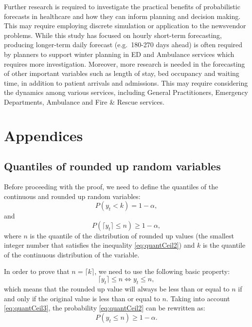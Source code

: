\documentclass[]{elsarticle} %
\begin{document}
Further research is required to investigate the practical benefits of probabilistic forecasts in healthcare and how they can inform planning and decision making. This may require employing discrete simulation or application to the newsvendor problems. While this study has focused on hourly short-term forecasting, producing longer-term daily forecast (e.g.~180-270 days ahead) is often required by planners to support winter planning in ED and Ambulance services which requires more investigation. Moreover, more research is needed in the forecasting of other important variables such as length of stay, bed occupancy and waiting time, in addition to patient arrivals and admissions. This may require considering the dynamics among various services, including General Practitioners, Emergency Departments, Ambulance and Fire \& Rescue services.

\hypertarget{appendices}{%
\section{Appendices}\label{appendices}}

\hypertarget{quantilesceiling}{%
\subsection{Quantiles of rounded up random variables}\label{quantilesceiling}}

Before proceeding with the proof, we need to define the quantiles of the continuous and rounded up random variables:
\begin{equation} \label{eq:quantCeil1}
    P \left(y_t < k \right) = 1 - \alpha ,
\end{equation}
and
\begin{equation} \label{eq:quantCeil2}
    P \left(\lceil y_t \rceil \leq n \right) \geq 1 - \alpha ,
\end{equation}
where \(n\) is the quantile of the distribution of rounded up values (the smallest integer number that satisfies the inequality \eqref{eq:quantCeil2}) and \(k\) is the quantile of the continuous distribution of the variable.

In order to prove that \(n = \lceil k \rceil\), we need to use the following basic property:
\begin{equation} \label{eq:quantCeil3}
    \lceil y_t \rceil \leq n \iff  y_t \leq n,
\end{equation}
which means that the rounded up value will always be less than or equal to \(n\) if and only if the original value is less than or equal to \(n\). Taking into account \eqref{eq:quantCeil3}, the probability \eqref{eq:quantCeil2} can be rewritten as:
\begin{equation} \label{eq:quantCeil4}
    P \left(y_t \leq n \right) \geq 1 - \alpha .
\end{equation}
\end{document}
